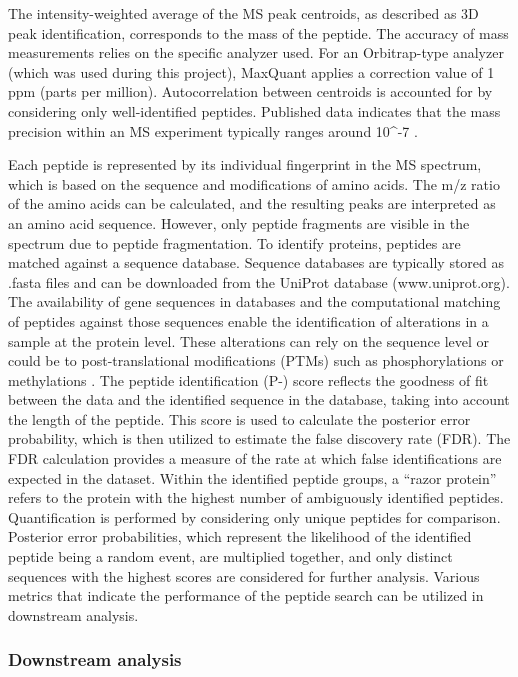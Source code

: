 \documentclass[
  11pt,
]{article}
\begin{document}
The intensity-weighted average of the MS peak centroids, as described as
3D peak identification, corresponds to the mass of the peptide. The
accuracy of mass measurements relies on the specific analyzer used. For
an Orbitrap-type analyzer (which was used during this project), MaxQuant
applies a correction value of 1 ppm (parts per million). Autocorrelation
between centroids is accounted for by considering only well-identified
peptides. Published data indicates that the mass precision within an MS
experiment typically ranges around 10\^{}-7 \citep{Wilschefski2019}.

Each peptide is represented by its individual fingerprint in the MS
spectrum, which is based on the sequence and modifications of amino
acids. The m/z ratio of the amino acids can be calculated, and the
resulting peaks are interpreted as an amino acid sequence. However, only
peptide fragments are visible in the spectrum due to peptide
fragmentation. To identify proteins, peptides are matched against a
sequence database. Sequence databases are typically stored as .fasta
files and can be downloaded from the UniProt database (www.uniprot.org).
The availability of gene sequences in databases and the computational
matching of peptides against those sequences enable the identification
of alterations in a sample at the protein level. These alterations can
rely on the sequence level or could be to post-translational
modifications (PTMs) such as phosphorylations or methylations
\citep{Aebersold2003}. The peptide identification (P-) score reflects
the goodness of fit between the data and the identified sequence in the
database, taking into account the length of the peptide. This score is
used to calculate the posterior error probability, which is then
utilized to estimate the false discovery rate (FDR). The FDR calculation
provides a measure of the rate at which false identifications are
expected in the dataset. Within the identified peptide groups, a ``razor
protein'' refers to the protein with the highest number of ambiguously
identified peptides. Quantification is performed by considering only
unique peptides for comparison. Posterior error probabilities, which
represent the likelihood of the identified peptide being a random event,
are multiplied together, and only distinct sequences with the highest
scores are considered for further analysis. Various metrics that
indicate the performance of the peptide search can be utilized in
downstream analysis.

\hypertarget{downstream-analysis}{%
\subsubsection{Downstream analysis}\label{downstream-analysis}}
\end{document}

